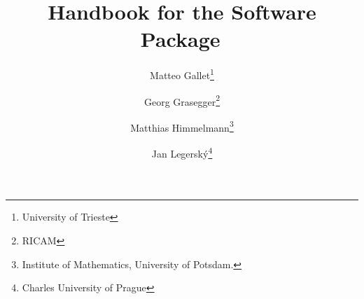 \documentclass[]{article}
\title{Handbook for the Software Package\, \raisebox{-0.15\totalheight}{\texttt{[image: icon.jpg]}}}
\author{Matteo Gallet\thanks{University of Trieste} \and Georg Grasegger\thanks{RICAM} \and Matthias Himmelmann\thanks{Institute of Mathematics, University of Potsdam.} \and Jan Legerský\thanks{Charles University of Prague}}
\begin{document}
\maketitle


\section{}
\end{document}
